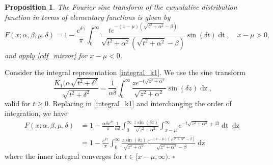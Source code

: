 \documentclass[10pt,a4paper,oneside]{article}
\newtheorem{proposition}[theorem]{Proposition}
\newenvironment{proof}{\noindent{\bf Proof:}}{\hfill$\square$}
\numberwithin{equation}{section}
\begin{document}
\begin{proposition}
The Fourier sine transform of the cumulative distribution function in terms of elementary functions is given by
\begin{equation}\label{sine_transform}
F(x; \alpha, \beta, \mu, \delta) = 1 - \frac{e^{\delta \gamma}}{\pi}\int_0^{\infty} \frac{t e^{-(x-\mu)\left(\sqrt{t^2 + \alpha^2} - \beta\right)}}{\sqrt{t^2 + \alpha^2}\left(\sqrt{t^2 + \alpha^2} - \beta\right)}\sin(\delta t)\mathop{dt}, \quad x-\mu > 0,
\end{equation}
and apply \eqref{cdf_mirror} for $x-\mu < 0$.
\end{proposition}
\begin{proof}
Consider the integral representation \eqref{integral_k1}. We use the sine transform \cite[\S 2.4]{Bateman1954}
\begin{equation*}
\frac{K_1(\alpha \sqrt{t^2 + \delta^2}}{\sqrt{t^2 + \delta^2}} = \frac{1}{\alpha\delta}\int_0^{\infty} \frac{z e^{-t\sqrt{z^2 + \alpha^2}}}{\sqrt{z^2 + \alpha^2}} \sin(\delta z) \mathop{dz},
\end{equation*}
valid for $t \ge 0$. Replacing in \eqref{integral_k1} and interchanging the order of integration, we have
\begin{align*}
F(x; \alpha, \beta, \mu, \delta) &= 1 - \frac{\alpha \delta e^{\delta \gamma}}{\pi}\frac{1}{\alpha\delta}\int_0^{\infty} \frac{z \sin(\delta z)}{\sqrt{z^2 + \alpha^2}}  \int_{x-\mu}^{\infty} e^{-t\sqrt{z^2 + \alpha^2} + \beta t} \mathop{dt} \mathop{dz}\\
&= 1 - \frac{e^{\delta \gamma}}{\pi}\int_0^{\infty} \frac{z \sin(\delta z)}{\sqrt{z^2 + \alpha^2}}  \frac{e^{-(x-\mu)\left(\sqrt{z^2 + \alpha^2} - \beta\right)}}{\sqrt{z^2 + \alpha^2} - \beta} \mathop{dz}
\end{align*}
where the inner integral converges for $t\in [x-\mu, \infty)$.
\end{proof}
\end{document}
